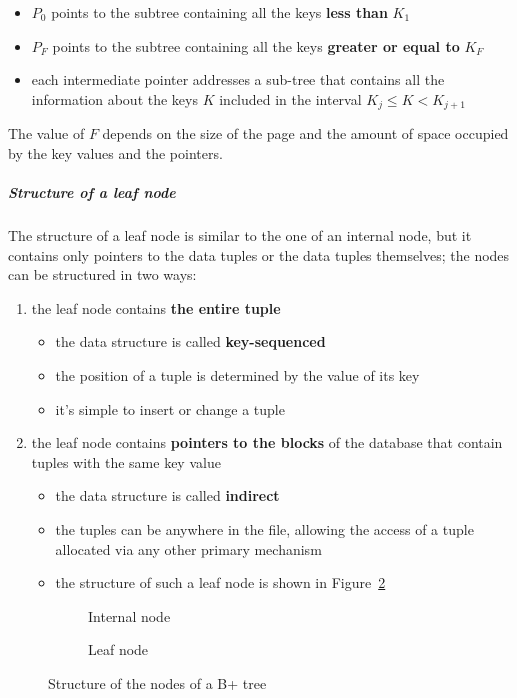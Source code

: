 \documentclass[english]{article}
\begin{document}
\begin{itemize}
  \item \(P_0\) points to the subtree containing all the keys \textbf{less than} \(K_1\)
  \item \(P_F\) points to the subtree containing all the keys \textbf{greater or equal to} \(K_F\)
  \item each intermediate pointer addresses a sub-tree that contains all the information about the keys \(K\) included in the interval \(K_j \leq K < K_{j + 1}\)
\end{itemize}

The value of \(F\) depends on the size of the page and the amount of space occupied by the key values and the pointers.

\subparagraph*{Structure of a leaf node}
The structure of a leaf node is similar to the one of an internal node, but it contains only pointers to the data tuples or the data tuples themselves;
the nodes can be structured in two ways:

\begin{enumerate}
  \item the leaf node contains \textbf{the entire tuple}
        \begin{itemize}
          \item the data structure is called \textbf{key-sequenced}
          \item the position of a tuple is determined by the value of its key
          \item it's simple to insert or change a tuple
        \end{itemize}
  \item the leaf node contains \textbf{pointers to the blocks} of the database that contain tuples with the same key value
        \begin{itemize}
          \item the data structure is called \textbf{indirect}
          \item the tuples can be anywhere in the file, allowing the access of a tuple allocated via any other primary mechanism
          \item the structure of such a leaf node is shown in Figure~\ref{subfig:b-tree-leaf-node}
        \end{itemize}
\end{enumerate}

\begin{figure}[htbp]
  \centering
  \bigskip
  \begin{subfigure}{0.99\textwidth}
    \centering
    \bigskip
    \caption{Internal node}
    \label{subfig:b-tree-internal-node}
    \bigskip
  \end{subfigure}
  \bigskip
  \begin{subfigure}{0.99\textwidth}
    \centering
    \bigskip
    \caption{Leaf node}
    \label{subfig:b-tree-leaf-node}
    \bigskip
  \end{subfigure}
  \caption{Structure of the nodes of a B+ tree}
  \label{fig:b-tree-structure}
\end{figure}
\end{document}
